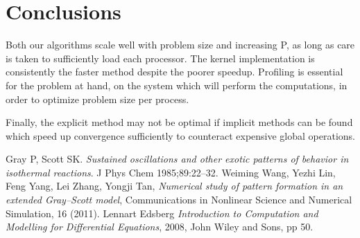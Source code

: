 \documentclass[a4paper,11pt]{article}
\begin{document}
\section*{Conclusions}

Both our algorithms scale well with problem size and increasing P, as long as care is taken to sufficiently load each processor. The kernel implementation is consistently the faster method despite the poorer speedup. Profiling is essential for the problem at hand, on the system which will perform the computations, in order to optimize problem size per process.

Finally, the explicit method may not be optimal if implicit methods can be found which speed up convergence sufficiently to counteract expensive global operations.

\clearpage
\begin{thebibliography}{}
 Gray P, Scott SK. {\it Sustained oscillations and other exotic patterns of behavior in isothermal reactions}. J Phys Chem 1985;89:22–32.
 Weiming Wang, Yezhi Lin, Feng Yang, Lei Zhang, Yongji Tan, {\it Numerical study of pattern formation in an extended Gray–Scott model}, Communications in Nonlinear Science and Numerical Simulation, 16 (2011).
 Lennart Edsberg {\it Introduction to Computation and Modelling for Differential Equations}, 2008, John Wiley and Sons, pp 50.
\end{thebibliography}
\end{document}
